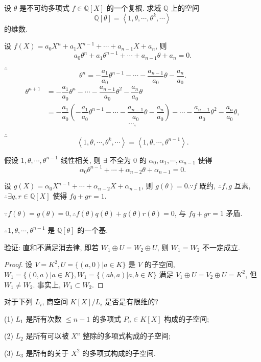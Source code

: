 \documentclass[color=black,device=normal,lang=cn,mode=geye]{elegantnote}
\begin{document}
\begin{exercise}%
    设 $\theta$ 是不可约多项式 $f\in\mathbb{Q}[X]$ 的一个复根. 求域 $\mathbb{Q}$ 上的空间
    \[\mathbb{Q}[\theta]=\left<1,\theta,\cdots,\theta^k,\cdots\right>\]
    的维数.
\end{exercise}
\begin{solution}
    设 $f(X)=a_0X^n+a_1X^{n-1}+\cdots+a_{n-1}X+a_n$, 则
    \[a_0\theta^n+a_1\theta^{n-1}+\cdots+a_{n-1}\theta+a_n=0.\]
    
    $\therefore$
    \[\theta^n=-\dfrac{a_1}{a_0}\theta^{n-1}-\cdots-\dfrac{a_{n-1}}{a_0}\theta-\dfrac{a_n}{a_0}.\]
    \begin{align*}
        \theta^{n+1} & =-\dfrac{a_1}{a_0}\theta^n-\cdots-\dfrac{a_{n-1}}{a_0}\theta^2-\dfrac{a_n}{a_0}\theta \\
        & =-\dfrac{a_1}{a_0}\left(-\dfrac{a_1}{a_0}\theta^{n-1}-\cdots-\dfrac{a_{n-1}}{a_0}\theta-\dfrac{a_n}{a_0}\right)-\cdots-\dfrac{a_{n-1}}{a_0}\theta^2-\dfrac{a_n}{a_0}\theta,
    \end{align*}
    \[\cdots,\]

    $\therefore$
    \[\left<1,\theta,\cdots,\theta^k,\cdots\right>=\left<1,\theta,\cdots,\theta^{n-1}\right>.\]

    假设 $1,\theta,\cdots,\theta^{n-1}$ 线性相关, 则 $\exists$ 不全为 $0$ 的 $\alpha_0,\alpha_1,\cdots,\alpha_{n-1}$ 使得
    \[\alpha_0\theta^{n-1}+\cdots+\alpha_{n-2}\theta+\alpha_{n-1}=0.\]

    设 $g(X)=\alpha_0X^{n-1}+\cdots+\alpha_{n-2}X+\alpha_{n-1}$, 则 $g(\theta)=0.\because f$ 既约, $\therefore f,g$ 互素, $\therefore\exists q,r\in\mathbb{Q}[X]$ 使得 $fq+gr=1$.

    $\because f(\theta)=g(\theta)=0,\therefore f(\theta)q(\theta)+g(\theta)r(\theta)=0$, 与 $fq+gr=1$ 矛盾.

    $\therefore1,\theta,\cdots,\theta^{n-1}$ 是 $\mathbb{Q}[\theta]$ 的一个基.
\end{solution}
\begin{exercise}%
    验证: 直和不满足消去律, 即若 $W_1\oplus U=W_2\oplus U$, 则 $W_1=W_2$ 不一定成立.
\end{exercise}
\begin{proof}
    设 $V=K^2,U=\{(a,0)|a\in K\}$ 是 $V$ 的子空间, $W_1=\{(0,a)|a\in K\},W_1=\{(ab,a)|a,b\in K\}$ 满足 $V_1\oplus U=V_2\oplus U=K^2$, 但 $W_1\neq W_2$. 事实上, $W_1\subset W_2$.
\end{proof}
\begin{exercise}%
    对于下列 $L_i$, 商空间 $K[X]/L_i$ 是否是有限维的?

    (1) $L_1$ 是所有次数 $\leq n-1$ 的多项式 $P_n\in K[X]$ 构成的子空间;

    (2) $L_2$ 是所有可以被 $X^n$ 整除的多项式构成的子空间;

    (3) $L_3$ 是所有的关于 $X^2$ 的多项式构成的子空间.
\end{exercise}
\end{document}
